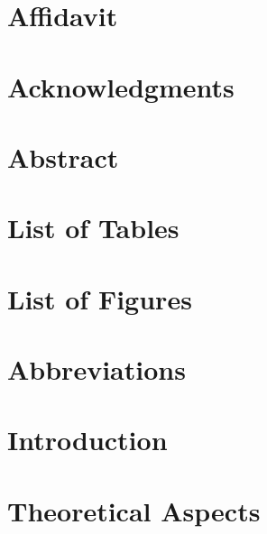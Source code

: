 \documentclass[a4paper,12pt,twoside]{report}
\author{\me}
\begin{document}


\normalsize

\chapter*{Affidavit}\label{chapter:Affidavit}
\setcounter{page}{0}



\chapter*{Acknowledgments}\label{chapter:Acknowledgments }



\chapter*{Abstract}\label{chapter:Abstract}



\tableofcontents

\chapter*{List of Tables}\label{chapter:List of Tables}


\chapter*{List of Figures}\label{chapter:List of Figures}


\chapter*{Abbreviations}\label{chapter:Abbreviations}


\chapter{Introduction}\label{chapter:Introduction}
\setcounter{page}{0}



\chapter{Theoretical Aspects}\label{chapter:Theory}

\end{document}
